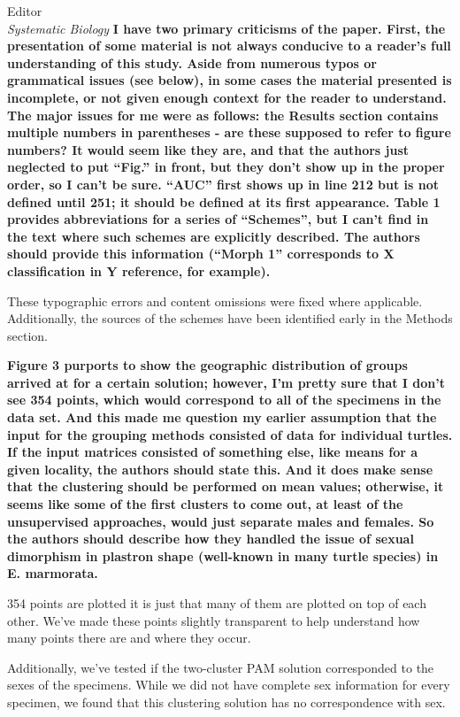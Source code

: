 \documentclass{letter}
\begin{document}
\begin{letter}{Editor \\ \textit{Systematic Biology}}
  \textbf{I have two primary criticisms of the paper. First, the presentation of some material is not always conducive to a reader’s full understanding of this study. Aside from numerous typos or grammatical issues (see below), in some cases the material presented is incomplete, or not given enough context for the reader to understand. The major issues for me were as follows: the Results section contains multiple numbers in parentheses - are these supposed to refer to figure numbers? It would seem like they are, and that the authors just neglected to put ``Fig.'' in front, but they don’t show up in the proper order, so I can’t be sure. ``AUC'' first shows up in line 212 but is not defined until 251; it should be defined at its first appearance. Table 1 provides abbreviations for a series of ``Schemes'', but I can’t find in the text where such schemes are explicitly described. The authors should provide this information (``Morph 1'' corresponds to X classification in Y reference, for example). }

  
  These typographic errors and content omissions were fixed where applicable. Additionally, the sources of the schemes have been identified early in the Methods section.
 

  \textbf{Figure 3 purports to show the geographic distribution of groups arrived at for a certain solution; however, I’m pretty sure that I don’t see 354 points, which would correspond to all of the specimens in the data set. And this made me question my earlier assumption that the input for the grouping methods consisted of data for individual turtles. If the input matrices consisted of something else, like means for a given locality, the authors should state this. And it does make sense that the clustering should be performed on mean values; otherwise, it seems like some of the first clusters to come out, at least of the unsupervised approaches, would just separate males and females. So the authors should describe how they handled the issue of sexual dimorphism in plastron shape (well-known in many turtle species) in E. marmorata. }

  354 points are plotted it is just that many of them are plotted on top of each other. We've made these points slightly transparent to help understand how many points there are and where they occur.

  Additionally, we've tested if the two-cluster PAM solution corresponded to the sexes of the specimens. While we did not have complete sex information for every specimen, we found that this clustering solution has no correspondence with sex. 
 


\end{letter}
\end{document}
